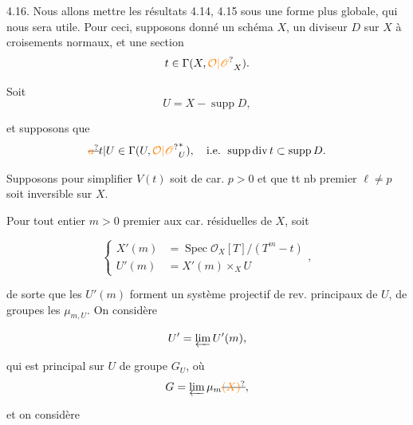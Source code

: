 4.16. Nous allons mettre les résultats 4.14, 4.15 sous une forme  plus globale, qui nous sera utile. Pour ceci, supposons donné un schéma  $X$,  un diviseur $D$ sur $X$ à croisements normaux, et une section
\[
t\in\Gamma(X,\unsure{\mathcal{O}|\mathscr{O}}_X).
\]

 


Soit
\[
U=X-\operatorname{supp}D,
\]

et supposons que
\[
\deleted{\unsure{a}}t|U\in\Gamma(U,\unsure{\mathcal{O}|\mathscr{O}}_U^*),\quad\text{i.e. }\operatorname{supp}\operatorname{div}t\subset\operatorname{supp}D.
\]

 Supposons pour simplifier  $V(t)$ soit de car. $p>0$ et que tt nb premier $\ell\ne p$ soit inversible sur $X$.

Pour tout  entier $m>0$ premier aux car. résiduelles de $X$,  soit

\[
\left\{\begin{aligned}
X'(m)&=\operatorname{Spec}\mathcal{O}_X[T]/(T^m-t)\\
U'(m)&=X'(m)\times_X U
\end{aligned}\right.,
\]

de sorte que les $U'(m)$ forment un système projectif de rev.  principaux de $U$, de groupes les $\mu_{m,U}$. On considère

\[
U'=\varprojlim U'(m),
\]

qui est principal sur $U$ de groupe  $G_U$, où
\[
G=\varprojlim\mu_m\deleted{\unsure{(X)}},
\]

et on  considère  

